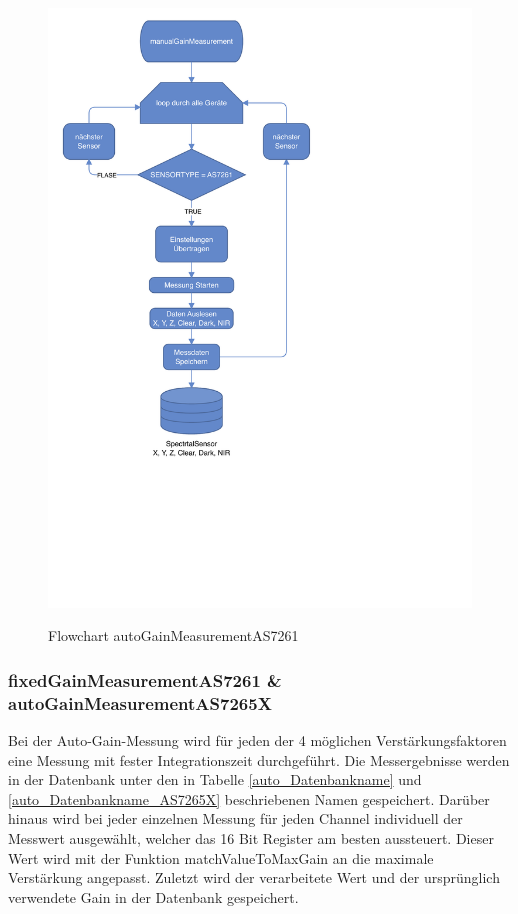 \begin{figure}[H]
  \centering
    \caption{Flowchart autoGainMeasurementAS7261}
 \includegraphics[width=1\linewidth]{img/manualGain}
  \label{fig:manualGain}
\end{figure}


\subsubsection{fixedGainMeasurementAS7261 \& autoGainMeasurementAS7265X}
Bei der Auto-Gain-Messung wird für jeden der 4 möglichen Verstärkungsfaktoren eine Messung mit fester Integrationszeit durchgeführt.
Die Messergebnisse werden in der Datenbank unter den in Tabelle \ref{auto_Datenbankname} und \ref{auto_Datenbankname_AS7265X} beschriebenen Namen gespeichert.
Darüber hinaus wird bei jeder einzelnen Messung für jeden Channel individuell der Messwert ausgewählt, welcher das 16 Bit Register am besten aussteuert.
Dieser Wert wird mit der Funktion matchValueToMaxGain an die maximale Verstärkung angepasst.
Zuletzt wird der verarbeitete Wert und der ursprünglich verwendete Gain in der Datenbank gespeichert.



